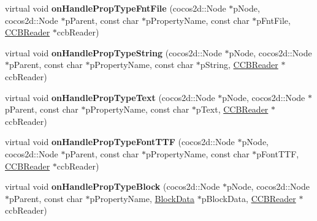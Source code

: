\begin{DoxyCompactItemize}
\item 
\mbox{\label{classcocosbuilder_1_1NodeLoader_a6a6a002127697e401ff48869122afa40}} 
virtual void {\bfseries on\+Handle\+Prop\+Type\+Fnt\+File} (cocos2d\+::\+Node $\ast$p\+Node, cocos2d\+::\+Node $\ast$p\+Parent, const char $\ast$p\+Property\+Name, const char $\ast$p\+Fnt\+File, \hyperlink{classcocosbuilder_1_1CCBReader}{C\+C\+B\+Reader} $\ast$ccb\+Reader)
\item 
\mbox{\label{classcocosbuilder_1_1NodeLoader_ac67828a98b15d81229b1781975385206}} 
virtual void {\bfseries on\+Handle\+Prop\+Type\+String} (cocos2d\+::\+Node $\ast$p\+Node, cocos2d\+::\+Node $\ast$p\+Parent, const char $\ast$p\+Property\+Name, const char $\ast$p\+String, \hyperlink{classcocosbuilder_1_1CCBReader}{C\+C\+B\+Reader} $\ast$ccb\+Reader)
\item 
\mbox{\label{classcocosbuilder_1_1NodeLoader_ae5ea08aaa6d9983adcf72a13b28a0d0f}} 
virtual void {\bfseries on\+Handle\+Prop\+Type\+Text} (cocos2d\+::\+Node $\ast$p\+Node, cocos2d\+::\+Node $\ast$p\+Parent, const char $\ast$p\+Property\+Name, const char $\ast$p\+Text, \hyperlink{classcocosbuilder_1_1CCBReader}{C\+C\+B\+Reader} $\ast$ccb\+Reader)
\item 
\mbox{\label{classcocosbuilder_1_1NodeLoader_ac94832ffcb28818a18c4e71430907e81}} 
virtual void {\bfseries on\+Handle\+Prop\+Type\+Font\+T\+TF} (cocos2d\+::\+Node $\ast$p\+Node, cocos2d\+::\+Node $\ast$p\+Parent, const char $\ast$p\+Property\+Name, const char $\ast$p\+Font\+T\+TF, \hyperlink{classcocosbuilder_1_1CCBReader}{C\+C\+B\+Reader} $\ast$ccb\+Reader)
\item 
\mbox{\label{classcocosbuilder_1_1NodeLoader_a0bffa7a6504c657d8a53edf333d50725}} 
virtual void {\bfseries on\+Handle\+Prop\+Type\+Block} (cocos2d\+::\+Node $\ast$p\+Node, cocos2d\+::\+Node $\ast$p\+Parent, const char $\ast$p\+Property\+Name, \hyperlink{structcocosbuilder_1_1BlockData}{Block\+Data} $\ast$p\+Block\+Data, \hyperlink{classcocosbuilder_1_1CCBReader}{C\+C\+B\+Reader} $\ast$ccb\+Reader)
\item 
\mbox{\label{classcocosbuilder_1_1NodeLoader_a991be71e714d99409d6a2a7e55c9e027}} 

\end{DoxyCompactItemize}
